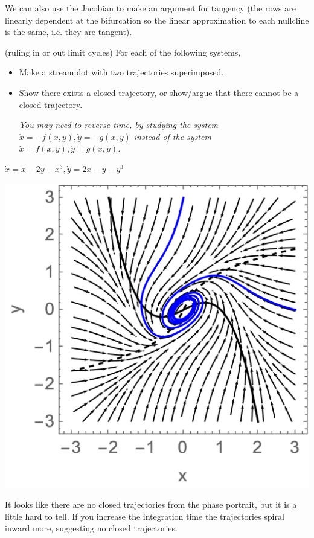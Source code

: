 \documentclass[12pt,letterpaper,answers]{exam}
\begin{document}
\begin{questions}
\begin{parts}
\begin{solution}
We can also use the Jacobian to make an argument for tangency (the rows are linearly dependent at the bifurcation so the linear approximation to each nullcline is the same, i.e. they are tangent).
\end{solution}
\end{parts}

\question (ruling in or out limit cycles) For each of the following systems, 
\begin{itemize}
    \item Make a streamplot with two trajectories superimposed.
    \item Show there exists a closed trajectory, or show/argue that there cannot be a closed trajectory.
    
    \emph{You may need to reverse time, by studying the system $\dot x = -f(x,y), \dot y = -g(x,y)$ instead of the system $\dot x = f(x,y), \dot y = g(x,y)$.}
\end{itemize}  
\begin{parts}
    \item $\dot x = x - 2y - x^3, \dot y = 2x - y - y^3$
    \begin{solution}

\includegraphics{img/PS07-S23-1.png}
    
It looks like there are no closed trajectories from the phase portrait, but it is a little hard to tell.  If you increase the integration time the trajectories spiral inward more, suggesting no closed trajectories.
    

\end{solution}
\end{parts}
\end{questions}
\end{document}
